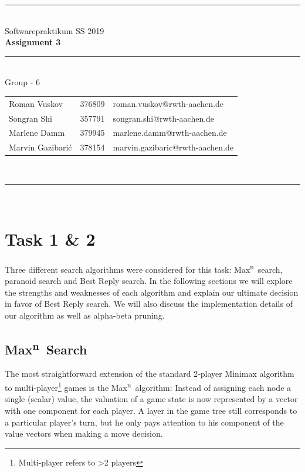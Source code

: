 \documentclass[a4paper,12pt]{article}
\newcommand{\Maxn}{Max\textsuperscript{n}\ }
\begin{document}
\begin{center}
	\rule{\textwidth}{0.1pt}\\[1cm]
	
	\Large Softwarepraktikum SS 2019\\\bf Assignment 3
\end{center}


\begin{center}

	\rule{\textwidth}{0.1pt}\\[0.5cm]

	{\Large Group - 6\\[5mm]}

	\begin{tabular}{lll}

		Roman Vuskov & 376809 & roman.vuskov@rwth-aachen.de \\

		Songran Shi & 357791 & songran.shi@rwth-aachen.de \\

		Marlene Damm & 379945 & marlene.damm@rwth-aachen.de \\
		
		Marvin Gazibarić & 378154 & marvin.gazibaric@rwth-aachen.de \\

	\end{tabular}\\[0.5cm]

	\rule{\textwidth}{0.1pt}\\[1cm]

\end{center}

\newpage
\section{Task 1 \& 2}
Three different search algorithms were considered for this task: \Maxn search, paranoid search and Best Reply search. In the following sections we will explore the strengths and weaknesses of each algorithm and explain our ultimate decision in favor of Best Reply search. We will also discuss the implementation details of our algorithm as well as alpha-beta pruning.

\subsection{\texorpdfstring{\Maxn Search}{Max\textasciicircum n Search}}
The most straightforward extension of the standard 2-player Minimax algorithm to multi-player\footnote{Multi-player refers to >2 players} games is the \Maxn algorithm: Instead of assigning each node a single (scalar) value, the valuation of a game state is now represented by a vector with one component for each player. A layer in the game tree still corresponds to a particular player's turn, but he only pays attention to his component of the value vectors when making a move decision.
\end{document}
